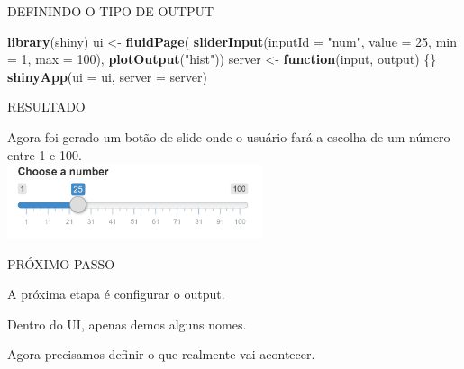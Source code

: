 \documentclass[
  ignorenonframetext,
]{beamer}
\newenvironment{Shaded}{\begin{snugshade}}{\end{snugshade}}
\newcommand{\ControlFlowTok}[1]{\textcolor[rgb]{0.13,0.29,0.53}{\textbf{#1}}}
\newcommand{\DataTypeTok}[1]{\textcolor[rgb]{0.13,0.29,0.53}{#1}}
\newcommand{\DecValTok}[1]{\textcolor[rgb]{0.00,0.00,0.81}{#1}}
\newcommand{\KeywordTok}[1]{\textcolor[rgb]{0.13,0.29,0.53}{\textbf{#1}}}
\newcommand{\NormalTok}[1]{#1}
\newcommand{\StringTok}[1]{\textcolor[rgb]{0.31,0.60,0.02}{#1}}
\begin{document}
\begin{frame}[fragile]{DEFININDO O TIPO DE OUTPUT}
\protect\hypertarget{definindo-o-tipo-de-output}{}


\begin{Shaded}
\begin{Highlighting}[]
\KeywordTok{library}\NormalTok{(shiny)}
\NormalTok{ui <-}\StringTok{ }\KeywordTok{fluidPage}\NormalTok{(}
  \KeywordTok{sliderInput}\NormalTok{(}\DataTypeTok{inputId =} \StringTok{"num"}\NormalTok{,}
              \DataTypeTok{value =} \DecValTok{25}\NormalTok{, }
              \DataTypeTok{min =} \DecValTok{1}\NormalTok{, }\DataTypeTok{max =} \DecValTok{100}\NormalTok{), }
  \KeywordTok{plotOutput}\NormalTok{(}\StringTok{"hist"}\NormalTok{))}
\NormalTok{server <-}\StringTok{ }\ControlFlowTok{function}\NormalTok{(input, output) \{\}}
\KeywordTok{shinyApp}\NormalTok{(}\DataTypeTok{ui =}\NormalTok{ ui, }\DataTypeTok{server =}\NormalTok{ server)}
\end{Highlighting}
\end{Shaded}

\end{frame}

\begin{frame}{RESULTADO}
\protect\hypertarget{resultado}{}

\begin{center}
      Agora foi gerado um \alert{botão de slide} onde o usuário fará a escolha de um número entre 1 e 100.\\\bigskip
    \includegraphics[width=75mm]{imagens/p1}
\end{center}

\end{frame}

\begin{frame}{PRÓXIMO PASSO}
\protect\hypertarget{proximo-passo-1}{}

\begin{center}
A próxima etapa é \alert{configurar} o output.
\end{center}
\begin{center} 
Dentro do UI, apenas demos alguns nomes.
\end{center}
\begin{center}
Agora precisamos definir o que realmente vai acontecer.
\end{center}

\end{frame}
\end{document}
